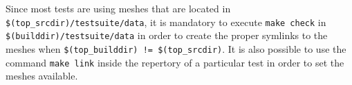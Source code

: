 \noindent Since most tests are using meshes that are located in
\verb+$(top_srcdir)/testsuite/data+, it is mandatory to execute \verb+make check+ in
\verb+$(builddir)/testsuite/data+ in order to create the proper
symlinks to the meshes when \verb+$(top_builddir) != $(top_srcdir)+. It is also possible
to use the command \verb+make link+ inside the repertory of a particular test in order to
set the meshes available.

%
%
